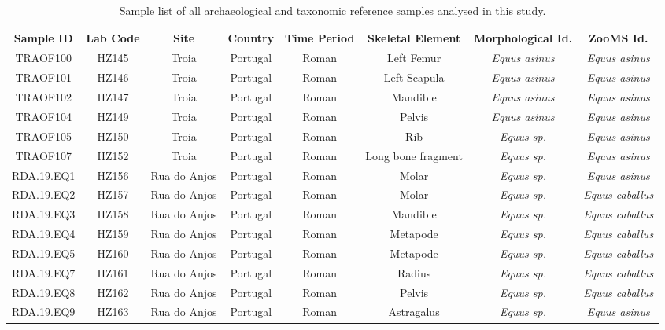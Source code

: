 \documentclass[
]{article}
\begin{document}
\begin{landscape}\begin{table}

\caption{\label{tab:si1table}Sample list of all archaeological and taxonomic reference samples analysed in this study.}
\centering
\fontsize{7}{9}\selectfont
\begin{tabular}[t]{cccccc>{}c>{}c}
\toprule
Sample ID & Lab Code & Site & Country & Time Period & Skeletal Element & Morphological Id. & ZooMS Id.\\
\midrule
TRAOF100 & HZ145 & Troia & Portugal & Roman & Left Femur & \em{Equus asinus} & \em{Equus asinus}\\
TRAOF101 & HZ146 & Troia & Portugal & Roman & Left Scapula & \em{Equus asinus} & \em{Equus asinus}\\
TRAOF102 & HZ147 & Troia & Portugal & Roman & Mandible & \em{Equus asinus} & \em{Equus asinus}\\
TRAOF104 & HZ149 & Troia & Portugal & Roman & Pelvis & \em{Equus asinus} & \em{Equus asinus}\\
TRAOF105 & HZ150 & Troia & Portugal & Roman & Rib & \em{Equus {\normalfont sp.}} & \em{Equus asinus}\\
TRAOF107 & HZ152 & Troia & Portugal & Roman & Long bone fragment & \em{Equus {\normalfont sp.}} & \em{Equus asinus}\\
RDA.19.EQ1 & HZ156 & Rua do Anjos & Portugal & Roman & Molar & \em{Equus {\normalfont sp.}} & \em{Equus asinus}\\
RDA.19.EQ2 & HZ157 & Rua do Anjos & Portugal & Roman & Molar & \em{Equus {\normalfont sp.}} & \em{Equus caballus}\\
RDA.19.EQ3 & HZ158 & Rua do Anjos & Portugal & Roman & Mandible & \em{Equus {\normalfont sp.}} & \em{Equus caballus}\\
RDA.19.EQ4 & HZ159 & Rua do Anjos & Portugal & Roman & Metapode & \em{Equus {\normalfont sp.}} & \em{Equus caballus}\\
RDA.19.EQ5 & HZ160 & Rua do Anjos & Portugal & Roman & Metapode & \em{Equus {\normalfont sp.}} & \em{Equus caballus}\\
RDA.19.EQ7 & HZ161 & Rua do Anjos & Portugal & Roman & Radius & \em{Equus {\normalfont sp.}} & \em{Equus caballus}\\
RDA.19.EQ8 & HZ162 & Rua do Anjos & Portugal & Roman & Pelvis & \em{Equus {\normalfont sp.}} & \em{Equus caballus}\\
RDA.19.EQ9 & HZ163 & Rua do Anjos & Portugal & Roman & Astragalus & \em{Equus {\normalfont sp.}} & \em{Equus asinus}\\

\end{tabular}
\end{table}
\end{landscape}
\end{document}
